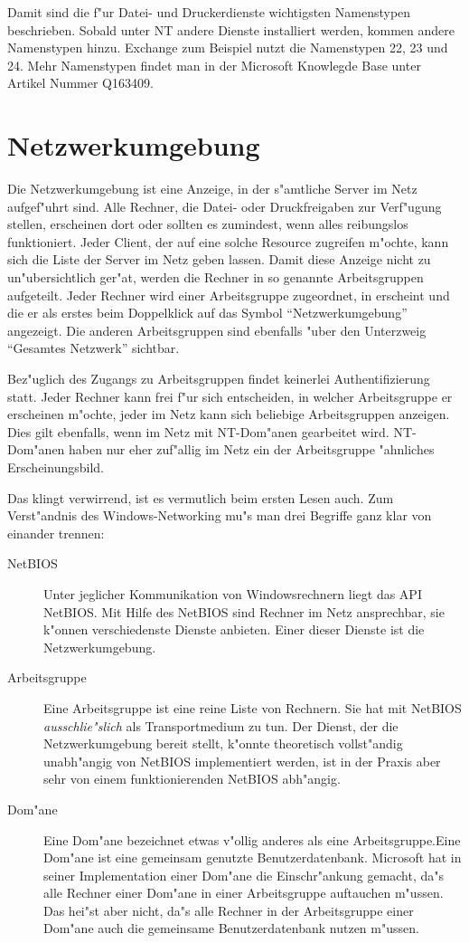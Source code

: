 \documentclass{scrartcl}\usepackage{pslatex}\typearea{12}
\begin{document}
Damit sind die f"ur Datei- und Druckerdienste wichtigsten Namenstypen
beschrieben. Sobald unter NT andere Dienste installiert werden, kommen
andere Namenstypen hinzu. Exchange zum Beispiel nutzt die Namenstypen
22, 23 und 24. Mehr Namenstypen findet man in der Microsoft Knowlegde
Base unter Artikel Nummer Q163409.

\section{Netzwerkumgebung}
\label{netzwerkumgebung}

Die Netzwerkumgebung ist eine Anzeige, in der s"amtliche Server im Netz
aufgef"uhrt sind. Alle Rechner, die Datei- oder Druckfreigaben
zur Verf"ugung stellen, erscheinen dort oder sollten es zumindest, wenn alles
reibungslos funktioniert. Jeder Client, der auf eine solche Resource
zugreifen m"ochte, kann sich die Liste der Server im Netz geben lassen. Damit
diese Anzeige nicht zu un"ubersichtlich ger"at, werden die Rechner in so
genannte Arbeitsgruppen aufgeteilt. Jeder Rechner wird einer Arbeitsgruppe
zugeordnet, in erscheint und die er als erstes beim Doppelklick auf das
Symbol "`Netzwerkumgebung"' angezeigt. Die anderen Arbeitsgruppen sind
ebenfalls "uber den Unterzweig "`Gesamtes Netzwerk"' sichtbar.

Bez"uglich des Zugangs zu Arbeitsgruppen findet keinerlei Authentifizierung
statt. Jeder Rechner kann frei f"ur sich entscheiden, in welcher Arbeitsgruppe
er erscheinen m"ochte, jeder im Netz kann sich beliebige Arbeitsgruppen
anzeigen. Dies gilt ebenfalls, wenn im Netz mit NT-Dom"anen gearbeitet wird.
NT-Dom"anen haben nur eher zuf"allig im Netz ein der Arbeitsgruppe "ahnliches
Erscheinungsbild.

Das klingt verwirrend, ist es vermutlich beim ersten Lesen auch. Zum
Verst"andnis des Windows-Networking mu"s man drei Begriffe ganz klar
von einander trennen:

\begin{description}
\item[NetBIOS] Unter jeglicher Kommunikation von Windowsrechnern liegt
  das API NetBIOS. Mit Hilfe des NetBIOS sind Rechner im Netz
  ansprechbar, sie k"onnen verschiedenste Dienste anbieten. Einer
  dieser Dienste ist die Netzwerkumgebung.
\item[Arbeitsgruppe] Eine Arbeitsgruppe ist eine reine Liste von
  Rechnern. Sie hat mit NetBIOS \emph{ausschlie"slich} als
  Transportmedium zu tun. Der Dienst, der die Netzwerkumgebung bereit stellt,
k"onnte theoretisch vollst"andig unabh"angig von NetBIOS implementiert werden,
ist in der Praxis aber sehr von einem funktionierenden NetBIOS abh"angig. 
  
\item[Dom"ane] Eine Dom"ane bezeichnet etwas v"ollig anderes als eine
  Arbeitsgruppe.Eine Dom"ane ist eine gemeinsam genutzte
  Benutzerdatenbank. Microsoft hat in seiner Implementation einer
  Dom"ane die Einschr"ankung gemacht, da"s alle Rechner einer Dom"ane
  in einer Arbeitsgruppe auftauchen m"ussen. Das hei"st aber nicht,
  da"s alle Rechner in der Arbeitsgruppe einer Dom"ane auch die
  gemeinsame Benutzerdatenbank nutzen m"ussen.
\end{description}
\end{document}
